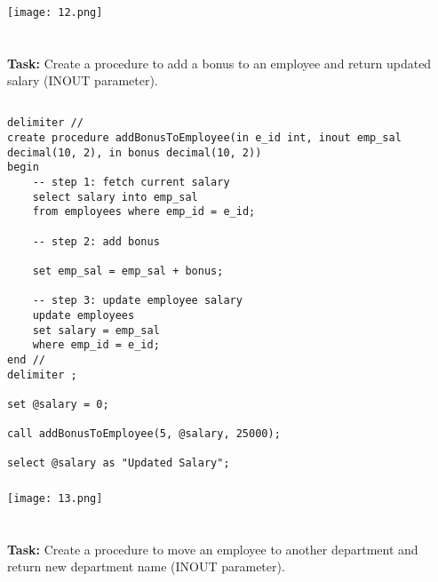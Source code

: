 \documentclass[12pt,a4paper]{article}
\begin{document}
\subsubsection{}
\begin{center}
    \texttt{[image: 12.png]}
\end{center}


\section{}
\textbf{Task:} Create a procedure to add a bonus to an employee and return updated salary (INOUT parameter).

\subsection{}
\begin{lstlisting}
delimiter //
create procedure addBonusToEmployee(in e_id int, inout emp_sal decimal(10, 2), in bonus decimal(10, 2))
begin
	-- step 1: fetch current salary
	select salary into emp_sal 
    from employees where emp_id = e_id;
    
    -- step 2: add bonus
    
    set emp_sal = emp_sal + bonus;
    
    -- step 3: update employee salary
    update employees
    set salary = emp_sal
    where emp_id = e_id;
end //
delimiter ;

set @salary = 0;

call addBonusToEmployee(5, @salary, 25000);

select @salary as "Updated Salary";
\end{lstlisting}

\subsubsection{}
\begin{center}
    \texttt{[image: 13.png]}
\end{center}


\section{}
\textbf{Task:} Create a procedure to move an employee to another department and return new
department name (INOUT parameter).
\end{document}
